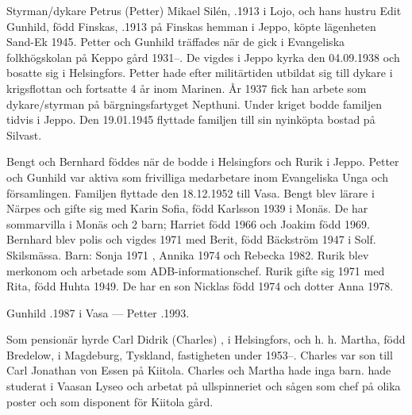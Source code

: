 Styrman/dykare Petrus (Petter) Mikael Silén, .1913 i Lojo, och hans hustru Edit Gunhild, född Finskas, .1913 på Finskas hemman i Jeppo, köpte lägenheten Sand-Ek 1945. Petter och Gunhild träffades när de gick i Evangeliska folkhögskolan på Keppo gård 1931--. De vigdes i Jeppo kyrka den 04.09.1938 och bosatte sig i Helsingfors. Petter hade efter militärtiden utbildat sig till dykare i krigsflottan och fortsatte 4 år inom Marinen. År 1937 fick han arbete som dykare/styrman på bärgningsfartyget Nepthuni. Under kriget bodde familjen tidvis i Jeppo. Den 19.01.1945 flyttade familjen till sin nyinköpta bostad på Silvast.
\begin{jhchildren}
  \item {}
  \item {}
  \item {}
\end{jhchildren}
Bengt och Bernhard föddes när de bodde i Helsingfors och Rurik i Jeppo. Petter och Gunhild var aktiva som frivilliga medarbetare inom Evangeliska Unga och församlingen. Familjen flyttade den 18.12.1952 till Vasa. Bengt blev lärare i Närpes och gifte sig med Karin Sofia, född Karlsson 1939 i  Monäs. De har sommarvilla i Monäs och 2 barn; Harriet född 1966 och Joakim född 1969. Bernhard blev polis och vigdes 1971 med Berit, född Bäckström 1947 i Solf. Skilsmässa. Barn: Sonja 1971 , Annika 1974 och Rebecka 1982. Rurik blev merkonom och arbetade som ADB-informationschef. Rurik gifte sig 1971 med Rita, född Huhta 1949. De har en son Nicklas född 1974 och dotter Anna 1978.

Gunhild .1987 i Vasa  ---  Petter .1993.


Som pensionär hyrde Carl Didrik (Charles) ,  i Helsingfors, och h. h. Martha, född Bredelow,  i Magdeburg, Tyskland, fastigheten under 1953--. Charles var son till Carl Jonathan von Essen på Kiitola. Charles och Martha hade inga barn.  hade studerat i Vaasan Lyseo och arbetat på ullspinneriet och sågen som chef på olika poster och som disponent för Kiitola gård.

